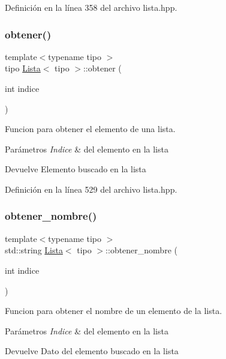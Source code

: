 Definición en la línea 358 del archivo lista.\+hpp.

\mbox{\label{classLista_a8ae71c3b813589c892ab1f4ff8edd753}} 
\subsubsection{\texorpdfstring{obtener()}{obtener()}}
{\footnotesize\ttfamily template$<$typename tipo $>$ \\
tipo \hyperlink{classLista}{Lista}$<$ tipo $>$\+::obtener (\begin{DoxyParamCaption}\item[{int}]{indice }\end{DoxyParamCaption})}



Funcion para obtener el elemento de una lista. 


\begin{DoxyParams}{Parámetros}
{\em Indice} & del elemento en la lista \\
\hline
\end{DoxyParams}
\begin{DoxyReturn}{Devuelve}
Elemento buscado en la lista 
\end{DoxyReturn}


Definición en la línea 529 del archivo lista.\+hpp.

\mbox{\label{classLista_ac1b4a38c8aee5835dcbb3185972c1b11}} 
\subsubsection{\texorpdfstring{obtener\+\_\+nombre()}{obtener\_nombre()}}
{\footnotesize\ttfamily template$<$typename tipo $>$ \\
std\+::string \hyperlink{classLista}{Lista}$<$ tipo $>$\+::obtener\+\_\+nombre (\begin{DoxyParamCaption}\item[{int}]{indice }\end{DoxyParamCaption})}



Funcion para obtener el nombre de un elemento de la lista. 


\begin{DoxyParams}{Parámetros}
{\em Indice} & del elemento en la lista \\
\hline
\end{DoxyParams}
\begin{DoxyReturn}{Devuelve}
Dato del elemento buscado en la lista 
\end{DoxyReturn}


